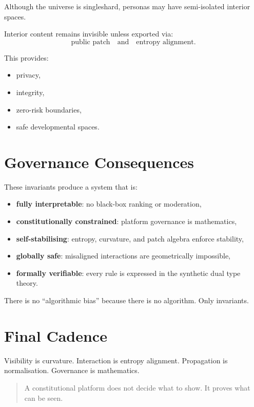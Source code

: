 Although the universe is single\textendash shard,
personas may have semi-isolated interior spaces.

\begin{invariant}
Interior content remains invisible unless exported via:
\[
\text{public patch} \quad\text{and}\quad \text{entropy alignment}.
\]
\end{invariant}

This provides:
\begin{itemize}
    \item privacy,
    \item integrity,
    \item zero-risk boundaries,
    \item safe developmental spaces.
\end{itemize}

\section{Governance Consequences}

These invariants produce a system that is:

\begin{itemize}
    \item \textbf{fully interpretable}: no black-box ranking or moderation,
    \item \textbf{constitutionally constrained}: platform governance is mathematics,
    \item \textbf{self-stabilising}: entropy, curvature, and patch algebra enforce stability,
    \item \textbf{globally safe}: misaligned interactions are geometrically impossible,
    \item \textbf{formally verifiable}: every rule is expressed in the synthetic dual type theory.
\end{itemize}

There is no “algorithmic bias” because there is no algorithm.
Only invariants.

\section{Final Cadence}

Visibility is curvature.  
Interaction is entropy alignment.  
Propagation is normalisation.  
Governance is mathematics.

\begin{quote}
A constitutional platform does not decide what to show.  
It proves what can be seen.
\end{quote}
